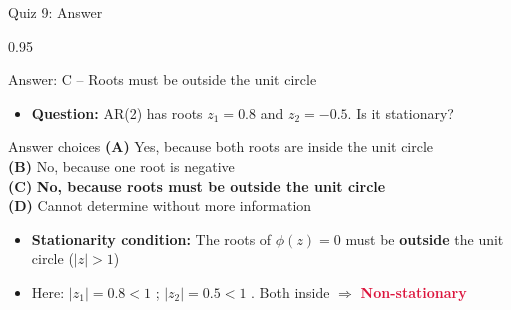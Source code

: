 \documentclass[9pt, aspectratio=169, t]{beamer}
\begin{document}
\begin{frame}{Quiz 9: Answer}
    \begin{cminipage}{0.95\textwidth}
    \begin{exampleblock}{Answer: C -- Roots must be outside the unit circle}
        \begin{itemize}\setlength{\itemsep}{0pt}
            \item \textbf{Question:} AR(2) has roots $z_1 = 0.8$ and $z_2 = -0.5$. Is it stationary?
        \end{itemize}

        \vspace{0.3cm}

    \begin{block}{Answer choices}
        \textcolor{MainBlue}{\textbf{(A)}} Yes, because both roots are inside the unit circle \incorrect\\[3pt]
        \textcolor{MainBlue}{\textbf{(B)}} No, because one root is negative \incorrect\\[3pt]
        \textcolor{MainBlue}{\textbf{(C)}} \textbf{\textcolor{Forest}{No, because roots must be outside the unit circle}} \correct\\[3pt]
        \textcolor{MainBlue}{\textbf{(D)}} Cannot determine without more information \incorrect
    \end{block}

        \vspace{0.3cm}

        \begin{itemize}
            \item \textbf{Stationarity condition:} The roots of $\phi(z) = 0$ must be \textbf{outside} the unit circle ($|z| > 1$)
            \item Here: $|z_1| = 0.8 < 1$ \incorrect; \quad $|z_2| = 0.5 < 1$ \incorrect. Both inside $\Rightarrow$ \textcolor{Crimson}{\textbf{Non-stationary}}
        \end{itemize}
    \end{exampleblock}

    \end{cminipage}
\end{frame}
\end{document}

